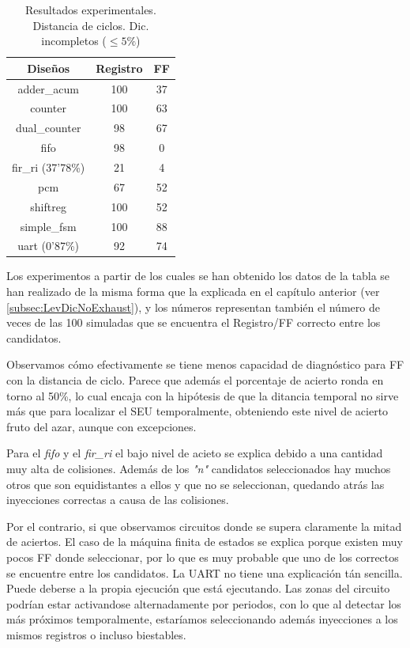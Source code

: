 \begin{table}[htbp]
    \ttabbox
    {\caption{Resultados experimentales. Distancia de ciclos. Dic.
    incompletos ($\leq5\%$)}
    \label{tab:CycleRes}}
    {
        \begin{tabular}{c|c c}
            \hline
            \rule[-8pt]{0pt}{22pt}{\bfseries{Diseños}}&{\bfseries{Registro}}
            &{\bfseries{\gls{FF}}} \\
            \hline
            \rule{0pt}{14pt}adder\_acum & 100 & 37\\
            counter & 100 & 63\\
            dual\_counter & 98 & 67\\
            fifo & 98 & 0\\
            fir\_ri (37'78\%) & 21 & 4\\
            pcm & 67 & 52\\
            shiftreg & 100 & 52\\
            simple\_fsm & 100 & 88\\
            uart (0'87\%) & 92 & 74\\
            \hline
        \end{tabular}
    }
\end{table}

Los experimentos a partir de los cuales se han obtenido los datos de la tabla se
han realizado de la misma forma que la explicada en el capítulo anterior
(ver \ref{subsec:LevDicNoExhaust}), y los números representan también el número de
veces de las 100 simuladas que se encuentra el Registro/FF correcto entre los
candidatos.

Observamos cómo efectivamente se tiene menos capacidad de diagnóstico para 
\gls{FF} con la distancia de ciclo. Parece que además el porcentaje de acierto
ronda en torno al 50\%, lo cual encaja con la hipótesis de que la ditancia
temporal no sirve más que para localizar el \gls{SEU} temporalmente, obteniendo
este nivel de acierto fruto del azar, aunque con excepciones.

Para el \textit{fifo} y el \textit{fir\_ri} el bajo nivel de acieto se explica
debido a una cantidad muy alta de colisiones. Además de los \textit{"n"} 
candidatos seleccionados hay muchos otros que son equidistantes a ellos y que no
se seleccionan, quedando atrás las inyecciones correctas a causa de las
colisiones.

Por el contrario, si que observamos circuitos donde se supera claramente la mitad
de aciertos. El caso de la máquina finita de estados se explica porque existen muy
pocos \gls{FF} donde seleccionar, por lo que es muy probable que uno de los
correctos se encuentre entre los candidatos. La \gls{UART} no tiene una
explicación tán sencilla. Puede deberse a la propia ejecución que está ejecutando.
Las zonas del circuito podrían estar activandose alternadamente por periodos, con
lo que al detectar los más próximos temporalmente, estaríamos seleccionando además
inyecciones a los mismos registros o incluso biestables.

\endinput
